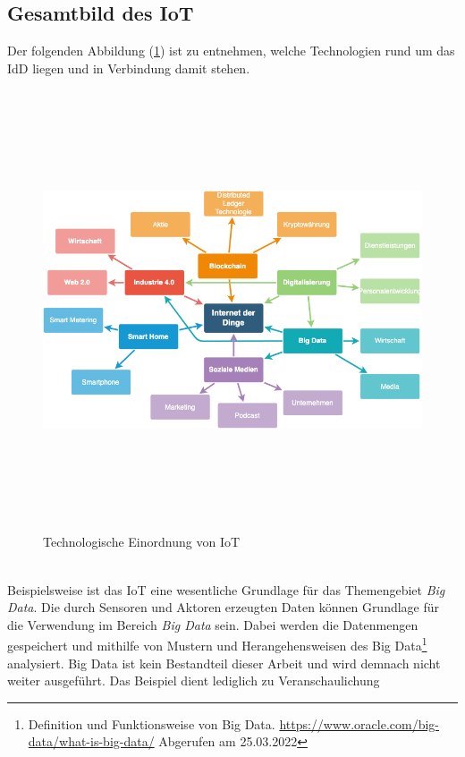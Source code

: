     \subsection*{Gesamtbild des \acl{IoT}}
        Der folgenden Abbildung (\ref{pic:mindmap_IoT}) ist zu entnehmen, welche Technologien rund um das \acl{IdD} liegen und in Verbindung damit stehen. 
        \begin{figure}[hbt!]
            \centering
            \includegraphics[width=13cm,height=13cm,keepaspectratio]{images/IoT-Mind_Map.png}
            \caption{Technologische Einordnung von IoT \cite{iotmindmap2018}}
            \label{pic:mindmap_IoT}
        \end{figure}
        \\
        \linebreak
        Beispielsweise ist das \acs{IoT} eine wesentliche Grundlage für das Themengebiet \textit{Big Data}. Die durch Sensoren und Aktoren erzeugten Daten 
        können Grundlage für die Verwendung im Bereich \textit{Big Data} sein. Dabei werden die Datenmengen gespeichert und mithilfe von Mustern 
        und Herangehensweisen des Big Data\footnote{Definition und Funktionsweise von Big Data. \url{https://www.oracle.com/big-data/what-is-big-data/} Abgerufen am 25.03.2022} analysiert. 
        Big Data ist kein Bestandteil dieser Arbeit und wird demnach nicht weiter ausgeführt. Das Beispiel dient lediglich zu Veranschaulichung 
